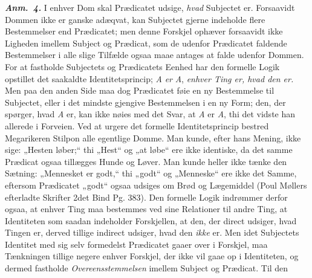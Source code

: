 \documentclass[12pt]{book}
\newcommand{\anm}[1]{\emph{\textbf{Anm.~#1.}}}
\newcommand{\opage}[1]{\marginnote{\footnotesize\textit{[#1]}}}
\begin{document}
\anm{4} I enhver Dom skal Prædicatet udsige, \emph{hvad} Subjectet er.
Forsaavidt Dommen ikke er ganske adæqvat, kan Subjectet gjerne indeholde flere
Bestemmelser end Prædicatet; men denne Forskjel ophæver forsaavidt ikke Ligheden
imellem Subject og Prædicat, som de udenfor Prædicatet faldende Bestemmelser i
alle slige Tilfælde ogsaa maae antages at falde udenfor Dommen. For at fastholde
Subjectets og Prædicatets Eenhed har den formelle Logik opstillet det saakaldte
Identitetsprincip; \textit{A} \emph{er} \textit{A}, \emph{enhver Ting er, hvad
den er.} Men paa den anden Side maa dog Prædicatet føie en ny Bestemmelse til
Subjectet, eller i det mindste gjengive Bestemmelsen i en ny Form; den, der
spørger, hvad \textit{A} er, kan ikke nøies med det Svar, at \textit{A} er
\textit{A}, thi det vidste han allerede i Forveien. Ved at urgere det formelle
Identitetsprincip bestred Megarikeren Stilpon alle egentlige Domme. Man kunde,
efter hans Mening, ikke sige: „Hesten løber;“ thi „Hest“ og „at løbe“ ere ikke
identiske, da det samme Prædicat ogsaa tillægges Hunde og Løver. Man kunde heller
ikke tænke den Sætning: „Mennesket er godt,“ thi „godt“ og „Menneske“ ere ikke
det Samme, eftersom Prædicatet „godt“ ogsaa udsiges om Brød og Lægemiddel (Poul
Møllers efterladte Skrifter 2det Bind Pg. 383). Den formelle Logik indrømmer
derfor ogsaa, at enhver Ting maa bestemmes ved sine Relationer til andre Ting, at
Identiteten som saadan indeholder Forskjellen, at den, der direct udsiger, hvad
Tingen er, derved tillige indirect udsiger, hvad den \emph{ikke} er. Men idet
Subjectets Identitet med sig selv formedelst Prædicatet gaaer over i Forskjel,
maa Tænkningen tillige negere enhver Forskjel, der ikke vil gaae op i
Identiteten, og
\opage{42} %
dermed fastholde \emph{Overeensstemmelsen} imellem Subject og Prædicat. Til den
\end{document}
